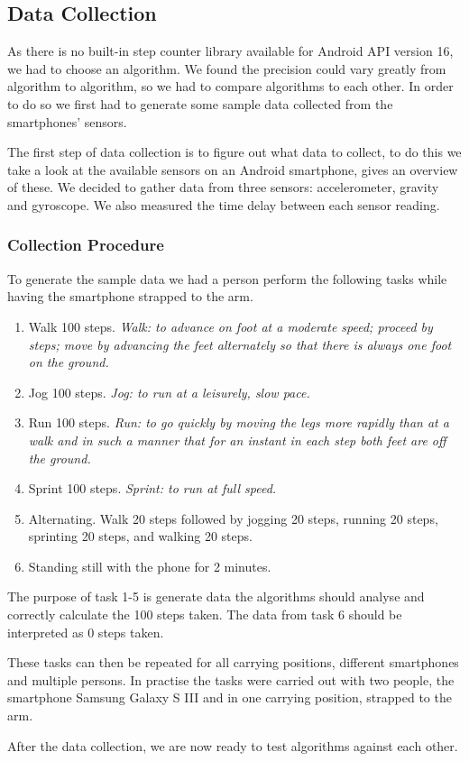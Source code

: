 \subsection{Data Collection}
As there is no built-in step counter library available for Android API version 16, we had to choose an algorithm. We found the precision could vary greatly from algorithm to algorithm, so we had to compare algorithms to each other. In order to do so we first had to generate some sample data collected from the smartphones' sensors. 

The first step of data collection is to figure out what data to collect, to do this we take a look at the available sensors on an Android smartphone, \citet{android:sensor} gives an overview of these. We decided to gather data from three sensors: accelerometer, gravity and gyroscope. We also measured the time delay between each sensor reading.

\subsubsection{Collection Procedure}
To generate the sample data we had a person perform the following tasks while having the smartphone strapped to the arm. 
\begin{enumerate}
\item Walk 100 steps. \textit{Walk: to advance on foot at a moderate speed; proceed by steps; move by advancing the feet alternately so that there is always one foot on the ground.}\citep[Walk]{dict:reference} %
\item Jog 100 steps. \textit{Jog: to run at a leisurely, slow pace.}\citep[Jog]{dict:reference} %
\item Run 100 steps. \textit{Run: to go quickly by moving the legs more rapidly than at a walk and in such a manner that for an instant in each step both feet are off the ground.}\citep[Run]{dict:reference} %
\item Sprint 100 steps. \textit{Sprint: to run at full speed.}\citep[Sprint]{dict:reference} %
\item Alternating. Walk 20 steps followed by jogging 20 steps, running 20 steps, sprinting 20 steps, and walking 20 steps.
\item Standing still with the phone for 2 minutes.
\end{enumerate}

The purpose of task 1-5 is generate data the algorithms should analyse and correctly calculate the 100 steps taken. The data from task 6 should be interpreted as 0 steps taken.

These tasks can then be repeated for all carrying positions, different smartphones and multiple persons. In practise the tasks were carried out with two people, the smartphone Samsung Galaxy S III and in one carrying position, strapped to the arm.

After the data collection, we are now ready to test algorithms against each other.
